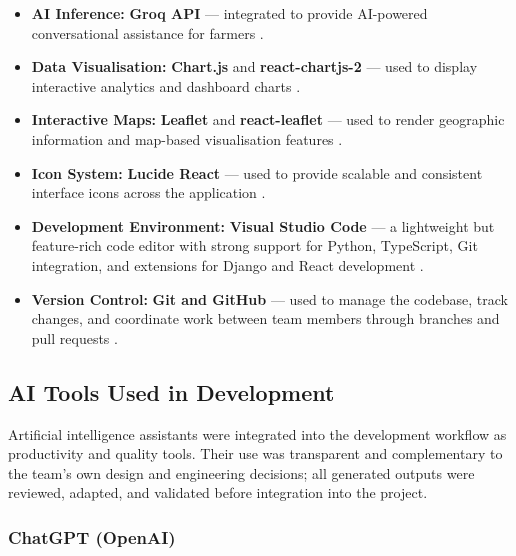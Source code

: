 \begin{itemize}
	\item \textbf{AI Inference:} \textbf{Groq API} — integrated to provide AI-powered conversational assistance for farmers \cite{GroqInc2024}.
	
	\item \textbf{Data Visualisation:} \textbf{Chart.js} and \textbf{react-chartjs-2} — used to display interactive analytics and dashboard charts \cite{ChartJS2024,ReactChartJS2024}.
	
	\item \textbf{Interactive Maps:} \textbf{Leaflet} and \textbf{react-leaflet} — used to render geographic information and map-based visualisation features \cite{AgafonkinLeaflet2024,ReactLeaflet2024}.
	
	\item \textbf{Icon System:} \textbf{Lucide React} — used to provide scalable and consistent interface icons across the application \cite{LucideReact2024}.
	
	\item \textbf{Development Environment:} \textbf{Visual Studio Code} — a lightweight but feature-rich code editor with strong support for Python, TypeScript, Git integration, and extensions for Django and React development \cite{Microsoft2024VSCode}.
	
	\item \textbf{Version Control:} \textbf{Git and GitHub} — used to manage the codebase, track changes, and coordinate work between team members through branches and pull requests \cite{Chacon2014ProGit}.
	
\end{itemize}

\subsection{AI Tools Used in Development}

Artificial intelligence assistants were integrated into the development workflow as productivity and quality tools. Their use was transparent and complementary to the team's own design and engineering decisions; all generated outputs were reviewed, adapted, and validated before integration into the project.

\subsubsection{ChatGPT (OpenAI)}

